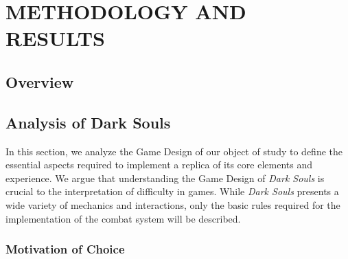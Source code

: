 \chapter{METHODOLOGY AND RESULTS}




\section{Overview}







\section{Analysis of Dark Souls}
\label{sec:analysis-dark-souls}

In this section, we analyze the Game Design of our object of study to define the essential aspects required to implement a replica of its core elements and experience. We argue that understanding the Game Design of \emph{Dark Souls} is crucial to the interpretation of difficulty in games. While \emph{Dark Souls} presents a wide variety of mechanics and interactions, only the basic rules required for the implementation of the combat system will be described.


\subsection{Motivation of Choice}

